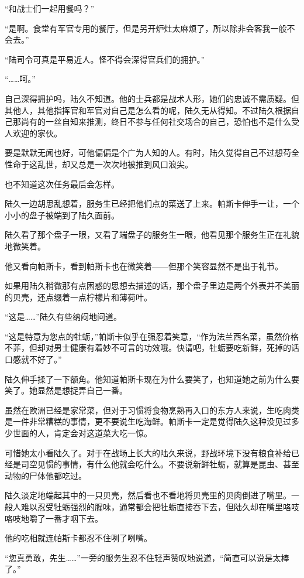 “和战士们一起用餐吗？”

“是啊。食堂有军官专用的餐厅，但是另开炉灶太麻烦了，所以除非会客我一般不会去。”

“陆司令可真是平易近人。怪不得会深得官兵们的拥护。”

“……呵。”

自己深得拥护吗，陆久不知道。他的士兵都是战术人形，她们的忠诚不需质疑。但其他人，其他指挥官和军官对自己是怎么看的呢，陆久无从得知。不过陆久根据自己那尚有的一丝自知来推测，终日不参与任何社交场合的自己，恐怕也不是什么受人欢迎的家伙。

要是默默无闻也好，可他偏偏是个广为人知的人。有时，陆久觉得自己不过想苟全性命于这乱世，却又总是一次次地被推到风口浪尖。

也不知道这次任务最后会怎样。

陆久一边胡思乱想着，服务生已经把他们点的菜送了上来。帕斯卡伸手一让，一个小小的盘子被端到了陆久面前。

陆久看了那个盘子一眼，又看了端盘子的服务生一眼，他看见那个服务生正在礼貌地微笑着。

他又看向帕斯卡，看到帕斯卡也在微笑着——但那个笑容显然不是出于礼节。

如果用陆久稍微那有点困惑的思想去描述的话，那个盘子里边是两个外表并不美丽的贝壳，还点缀着一点柠檬片和薄荷叶。

“这是……”陆久有些纳闷地问道。

“这是特意为您点的牡蛎，”帕斯卡似乎在强忍着笑意，“作为法兰西名菜，虽然价格不菲，但却对男士健康有着妙不可言的功效哦。快请吧，牡蛎要吃新鲜，死掉的话口感就不好了。”

陆久伸手揉了一下额角。他知道帕斯卡现在为什么要笑了，也知道她之前为什么要笑了。她显然是想捉弄自己一番。

虽然在欧洲已经是家常菜，但对于习惯将食物烹熟再入口的东方人来说，生吃肉类是一件非常糟糕的事情，更不要说生吃海鲜。帕斯卡一定是觉得陆久这种没见过多少世面的人，肯定会对这道菜大吃一惊。

可惜她太小看陆久了。对于在战场上长大的陆久来说，野战环境下没有粮食补给已经是司空见惯的事情，有什么他就会吃什么。不要说新鲜牡蛎，就算是昆虫、甚至动物的尸体他都吃过。

陆久淡定地端起其中的一只贝壳，然后看也不看地将贝壳里的贝肉倒进了嘴里。一般人难以忍受牡蛎强烈的腥味，通常都会把牡蛎直接吞下去，但陆久却在嘴里咯吱咯吱地嚼了一番才咽下去。

他的吃相就连帕斯卡都忍不住咧了咧嘴。

“您真勇敢，先生……”一旁的服务生忍不住轻声赞叹地说道，“简直可以说是太棒了。”

